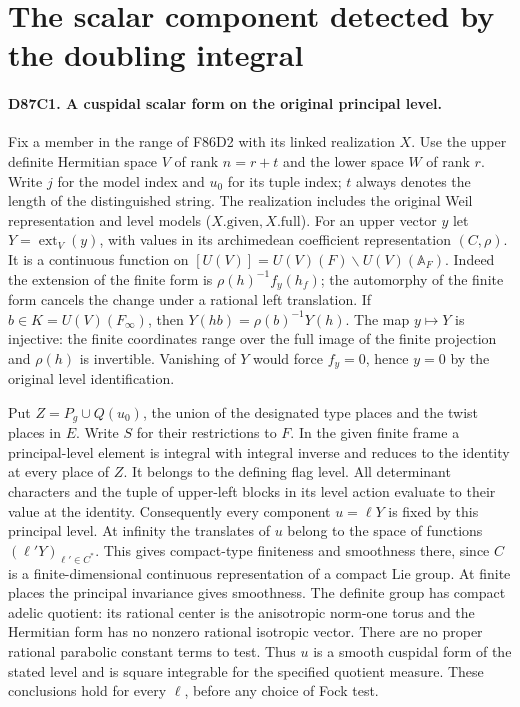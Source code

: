 \section{The scalar component detected by the doubling integral}

\paragraph{D87C1. A cuspidal scalar form on the original principal level.}
Fix a member in the range of F86D2 with its linked realization $X$.
Use the upper definite Hermitian space $V$ of rank $n=r+t$ and the
lower space $W$ of rank $r$. Write $j$ for the model index and
$u_0$ for its tuple index; $t$ always denotes the length of the
distinguished string. The realization includes the original Weil
representation and level models ($X.\mathrm{given},X.\mathrm{full}$).
For an upper vector $y$ let $Y=\operatorname{ext}_V(y)$, with values
in its archimedean coefficient representation $(C,\rho)$.
It is a continuous function on $[U(V)]=U(V)(F)\backslash U(V)(\mathbb A_F)$.
Indeed the extension of the finite form is $\rho(h)^{-1}f_y(h_f)$;
the automorphy of the finite form cancels the change under a rational
left translation. If $b\in K=U(V)(F_\infty)$, then
$Y(hb)=\rho(b)^{-1}Y(h)$. The map $y\mapsto Y$ is injective:
the finite coordinates range over the full image of the finite
projection and $\rho(h)$ is invertible. Vanishing of $Y$ would
force $f_y=0$, hence $y=0$ by the original level identification.

Put $Z=P_g\cup Q(u_0)$, the union of the designated type places
and the twist places in $E$. Write $S$ for their restrictions to
$F$. In the given finite frame a principal-level element is integral
with integral inverse and reduces to the identity at every place of
$Z$. It belongs to the defining flag level. All determinant characters
and the tuple of upper-left blocks in its level action evaluate to
their value at the identity. Consequently every component $u=\ell Y$
is fixed by this principal level. At infinity the translates of $u$
belong to the space of functions $(\ell'Y)_{\ell'\in C^*}$.
This gives compact-type finiteness and smoothness there, since
$C$ is a finite-dimensional continuous representation of a compact
Lie group. At finite places the principal invariance gives smoothness.
The definite group has compact adelic quotient: its rational center
is the anisotropic norm-one torus and the Hermitian form has no
nonzero rational isotropic vector. There are no proper rational
parabolic constant terms to test. Thus $u$ is a smooth cuspidal
form of the stated level and is square integrable for the specified
quotient measure. These conclusions hold for every $\ell$, before
any choice of Fock test.

